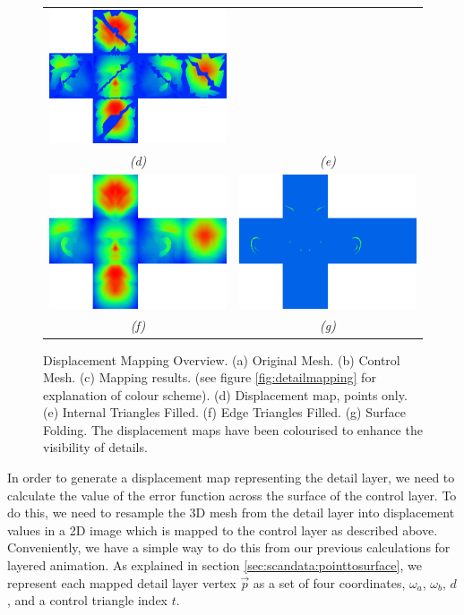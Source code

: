 \begin{figure}
\begin{center}
\begin{tabular}{cc}
\includegraphics[width=5.9cm]{../images/cubehead_noedges} \\
{\it (d)} & {\it (e)} \\
\includegraphics[width=5.9cm]{../images/cubehead_full} &
\includegraphics[width=5.9cm]{../images/cubehead_folds} \\
{\it (f)} & {\it (g)}
\end{tabular}
\caption[Displacement Mapping]{\label{fig:dispmap} Displacement Mapping Overview. (a) Original Mesh. (b) Control Mesh. (c) Mapping results. (see figure \ref{fig:detailmapping} for explanation of colour scheme). (d) Displacement map, points only. (e) Internal Triangles Filled. (f) Edge Triangles Filled. (g) Surface Folding. The displacement maps have been colourised to enhance the visibility of details.}
\end{center}
\end{figure}

In order to generate a displacement map representing the detail layer, we need to calculate the value of the error function across the surface of the control layer. To do this, we need to resample the 3D mesh from the detail layer into displacement values in a 2D image which is mapped to the control layer as described above. Conveniently, we have a simple way to do this from our previous calculations for layered animation. As explained in section \ref{sec:scandata:pointtosurface}, we represent each mapped detail layer vertex $\vec{p}$ as a set of four coordinates, $\omega_a$, $\omega_b$, $d$, and a control triangle index $t$.

